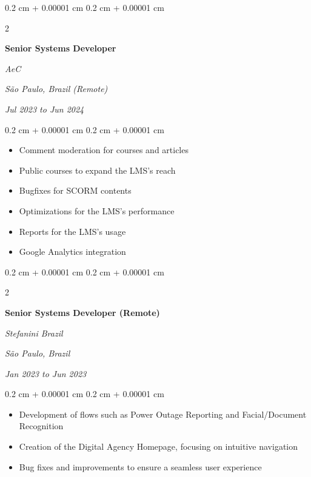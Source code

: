 \documentclass[10pt, a4paper]{article}
\newenvironment{highlights}{
    \begin{itemize}[
        topsep=0.10 cm,
        parsep=0.10 cm,
        partopsep=0pt,
        itemsep=0pt,
        leftmargin=0.4 cm + 10pt
    ]
}{
    \end{itemize}
} %
\newenvironment{onecolentry}{
    \begin{adjustwidth}{
        0.2 cm + 0.00001 cm
    }{
        0.2 cm + 0.00001 cm
    }
}{
    \end{adjustwidth}
} %
\newenvironment{twocolentry}[2][]{
    \onecolentry
    \def\secondColumn{#2}
    \setcolumnwidth{\fill, 7 cm}
    \begin{paracol}{2}
}{
    \switchcolumn \raggedleft \secondColumn
    \end{paracol}
    \endonecolentry
} %
\begin{document}
        \vspace{0.2 cm}

        \begin{twocolentry}{
        \textit{São Paulo, Brazil (Remote)}    
            
        \textit{Jul 2023 to Jun 2024}}
            \textbf{Senior Systems Developer}
            
            \textit{AeC}
        \end{twocolentry}

        \vspace{0.10 cm}
        \begin{onecolentry}
            \begin{highlights}
                \item Comment moderation for courses and articles
                \item Public courses to expand the LMS's reach
                \item Bugfixes for SCORM contents
                \item Optimizations for the LMS's performance
                \item Reports for the LMS's usage
                \item Google Analytics integration
            \end{highlights}
        \end{onecolentry}


        \vspace{0.2 cm}

        \begin{twocolentry}{
        \textit{São Paulo, Brazil}    
            
        \textit{Jan 2023 to Jun 2023}}
            \textbf{Senior Systems Developer (Remote)}
            
            \textit{Stefanini Brazil}
        \end{twocolentry}

        \vspace{0.10 cm}
        \begin{onecolentry}
            \begin{highlights}
                \item Development of flows such as Power Outage Reporting and Facial/Document Recognition
                \item Creation of the Digital Agency Homepage, focusing on intuitive navigation
                \item Bug fixes and improvements to ensure a seamless user experience
            \end{highlights}
        \end{onecolentry}
\end{document}
